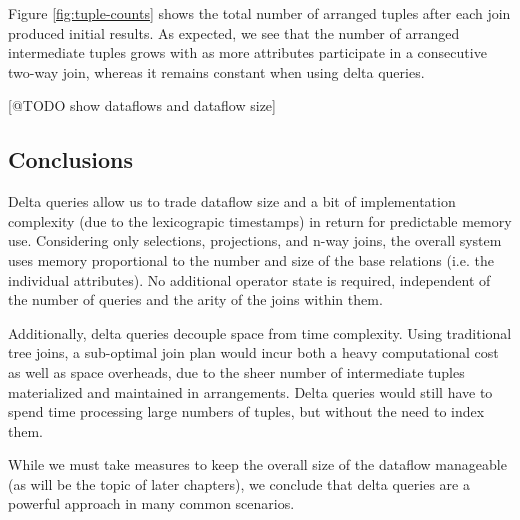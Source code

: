 \documentclass[../catalog.tex]{subfiles}
\begin{document}
Figure \ref{fig:tuple-counts} shows the total number of arranged
tuples after each join produced initial results. As expected, we see
that the number of arranged intermediate tuples grows with as more
attributes participate in a consecutive two-way join, whereas it
remains constant when using delta queries.

[@TODO show dataflows and dataflow size]

\subsection{Conclusions}

Delta queries allow us to trade dataflow size and a bit of
implementation complexity (due to the lexicograpic timestamps) in
return for predictable memory use. Considering only selections,
projections, and n-way joins, the overall system uses memory
proportional to the number and size of the base relations (i.e. the
individual attributes). No additional operator state is required,
independent of the number of queries and the arity of the joins within
them.

Additionally, delta queries decouple space from time complexity. Using
traditional tree joins, a sub-optimal join plan would incur both a
heavy computational cost as well as space overheads, due to the sheer
number of intermediate tuples materialized and maintained in
arrangements. Delta queries would still have to spend time processing
large numbers of tuples, but without the need to index them.

While we must take measures to keep the overall size of the dataflow
manageable (as will be the topic of later chapters), we conclude that
delta queries are a powerful approach in many common scenarios.
\end{document}
